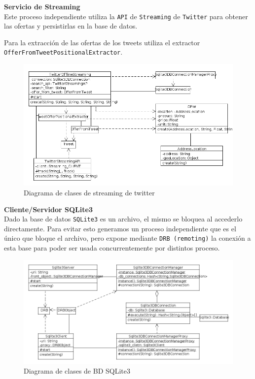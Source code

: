 \textbf{Servicio de Streaming}\\

Este proceso independiente utiliza la \texttt{API} de \texttt{Streaming} de \texttt{Twitter} para obtener las ofertas y persistirlas en la base de datos.

Para la extracci\'on de las ofertas de los tweets utiliza el extractor \texttt{OfferFromTweetPositionalExtractor}.

\begin{figure}[h]
\centerline{\includegraphics[width=\textwidth]{./imgs/class_diagram_offline_streaming.png}}
\caption{Diagrama de clases de streaming de twitter}
\label{fig:class_offline_streaming}
\end{figure}

\textbf{Cliente/Servidor SQLite3}\\

Dado la base de datos \texttt{SQLite3} es un archivo, el mismo se bloquea al accederlo
directamente. Para evitar esto generamos un proceso independiente que es el \'unico que bloque el archivo, pero expone mediante \texttt{DRB (remoting)} la conexi\'on a esta base para poder ser usada concurrentemente por distintos proceso.

\begin{figure}[h]
\centerline{\includegraphics[width=\textwidth]{./imgs/class_diagram_sqlite3_client_server.png}}
\caption{Diagrama de clases de BD SQLite3}
\label{fig:class_sqlite3_client_server}
\end{figure}

